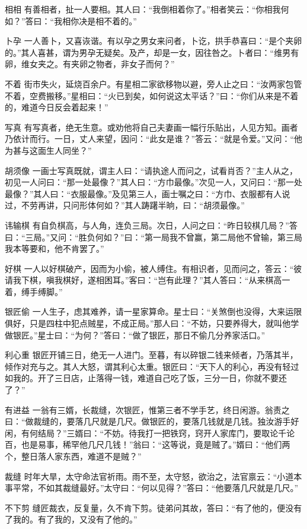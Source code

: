 \documentclass[12pt,UTF8]{ctexbook}
\begin{document}
相相
有善相者，扯一人要相。其人曰：“我倒相着你了。”相者笑云：“你相我何如？”答曰：“我相你决是相不着的。”

卜孕
一人善卜，又喜诙谐。有以孕之男女来问者，卜讫，拱手恭喜曰：“是个夹卵的。”其人喜甚，谓为男孕无疑矣。及产，却是一女，因往咎之。卜者曰：“维男有卵，维女夹之。有夹卵之物者，非女子而何？”

不着
街市失火，延烧百余户。有星相二家欲移物以避，旁人止之曰：“汝两家包管不着，空费搬移。”星相曰：“火已到矣，如何说这太平话？”曰：“你们从来是不着的，难道今日反会着起来！”

写真
有写真者，绝无生意。或劝他将自己夫妻画一幅行乐贴出，人见方知。画者乃依计而行。一日，丈人来望，因问：“此女是谁？”答云：“就是令爱。”又问：“他为甚与这面生人同坐？”

胡须像
一画士写真既就，谓主人曰：“请执途人而问之，试看肖否？”主人从之，初见一人问曰：“那一处最像？”其人曰：“方巾最像。”次见一人，又问曰：“那一处最像？”其人曰：“衣服最像。”及见第三人，画士嘱之曰：“方巾、衣服都有人说过，不劳再讲，只问形体何如？”其人踌躇半晌，曰：“胡须最像。”

讳输棋
有自负棋高，与人角，连负三局。次日，人问之曰：“昨日较棋几局？”答曰：“三局。”又问：“胜负何如？”曰：“第一局我不曾赢，第二局他不曾输，第三局我本等要和，他不肯罢了。”

好棋
一人以好棋破产，因而为小偷，被人缚住。有相识者，见而问之，答云：“彼请我下棋，嗔我棋好，遂相困耳。”客曰：“岂有此理？”其人答曰：“从来棋高一着，缚手缚脚。”

银匠偷
一人生子，虑其难养，请一星家算命。星士曰：“关煞倒也没得，大来运限俱好，只是四柱中犯点贼星，不成正局。”那人曰：“不妨，只要养得大，就叫他学做银匠。”星士曰：“为何？”答曰：“做了银匠，那日不偷几分养家活口。”

利心重
银匠开铺三日，绝无一人进门。至暮，有以碎银二钱来倾者，乃落其半，倾作对充与之。其人大怒，谓其利心太重。银匠曰：“天下人的利心，再没有轻过如我的。开了三日店，止落得一钱，难道自己吃了饭，三分一日，你就不要还了？”

有进益
一翁有三婿，长裁缝，次银匠，惟第三者不学手艺，终日闲游。翁责之曰：“做裁缝的，要落几尺就是几尺。做银匠的，要落几钱就是几钱。独汝游手好闲，有何结局？”三婿曰：“不妨。待我打一把铁窍，窍开人家库门，要取论千论百，也是易事，稀罕他几尺几钱！”翁曰：“这等说，竟是贼了。”婿曰：“他们两个，整日落人家东西，难道不是贼？”

裁缝
时年大旱，太守命法官祈雨。雨不至，太守怒，欲治之，法官禀云：“小道本事平常，不如其裁缝最好。”太守曰：“何以见得？”答曰：“他要落几尺就是几尺。”

不下剪
缝匠裁衣，反复量，久不肯下剪。徒弟问其故，答曰：“有了他的，便没有了我的。有了我的，又没有了他的。”
\end{document}
